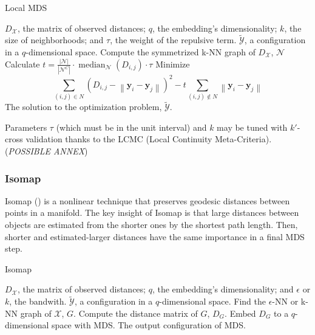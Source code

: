 \begin{algorithm}
    \caption{Local MDS}
    \label{alg:LocalMDS}
    
    \begin{algorithmic}[1]
    \REQUIRE $D_{\mathcal{X}}$, the matrix of observed distances; $q$, the embedding's dimensionality; $k$, the size of neighborhoods; and $\tau$, the weight of the repulsive term.
    \ENSURE $\tilde{\mathcal{Y}}$, a configuration in a $q$-dimensional space.
    \STATE Compute the symmetrized k-NN graph of $D_{\mathcal{X}}$, $\mathcal{N}$
    \STATE Calculate $t=\frac{|\mathcal{N}|}{\left|\mathcal{N}^C\right|} \cdot \operatorname{median}_{\mathcal{N}}\left(D_{i, j}\right) \cdot \tau$
    \STATE Minimize $$\sum_{(i, j) \in N}\left(D_{i, j}-\left\|\mathbf{y}_i-\mathbf{y}_j\right\|\right)^2 - t \sum_{(i, j) \notin N}\left\|\mathbf{y}_i-\mathbf{y}_j\right\|$$
    \RETURN The solution to the optimization problem, $\tilde{\mathcal{Y}}$.
    \end{algorithmic}
\end{algorithm}

Parameters $\tau$ (which must be in the unit interval) and $k$ may be tuned with $k'$-cross validation thanks to the LCMC (Local Continuity Meta-Criteria). (\textit{POSSIBLE ANNEX})

\subsubsection{Isomap}

Isomap (\cite{Tenenbaum2000}) is a nonlinear technique that preserves geodesic distances between points in a manifold. The key insight of Isomap is that large distances between objects are estimated from the shorter ones by the shortest path length. Then, shorter and estimated-larger distances have the same importance in a final MDS step.

\begin{algorithm}
    \caption{Isomap}
    \label{alg:Isomap}

    \begin{algorithmic}[1]
    \REQUIRE $D_{\mathcal{X}}$, the matrix of observed distances; $q$, the embedding's dimensionality; and $\epsilon$ or $k$, the bandwith.
    \ENSURE $\tilde{\mathcal{Y}}$, a configuration in a $q$-dimensional space.
    \STATE Find the $\epsilon$-NN or k-NN graph of $\mathcal{X}$, $G$.
    \STATE Compute the distance matrix of $G$, $D_G$.
    \STATE Embed $D_G$ to a $q$-dimensional space with MDS.
    \RETURN The output configuration of MDS.
    
    \end{algorithmic}
\end{algorithm}

